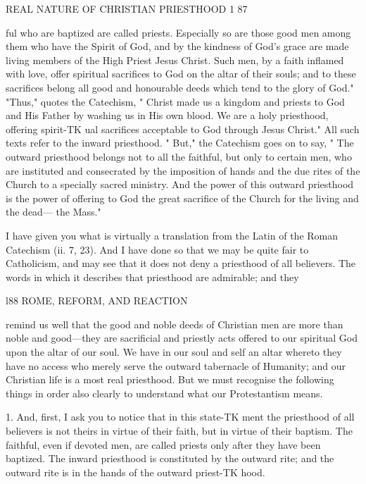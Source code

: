 \documentclass[12pt,a5paper,oneside]{book}
\begin{document}
{REAL NATURE OF CHRISTIAN PRIESTHOOD 1 87 

ful who are baptized are called priests. Especially so 
are those good men among them who have the Spirit 
of God, and by the kindness of God's grace are made 
living members of the High Priest Jesus Christ. Such 
men, by a faith inflamed with love, offer spiritual 
sacrifices to God on the altar of their souls; and to 
these sacrifices belong all good and honourable deeds 
which tend to the glory of God." "Thus," quotes 
the Catechism, " Christ made us a kingdom and 
priests to God and His Father by washing us in His 
own blood. We are a holy priesthood, offering spirit-TK
ual sacrifices acceptable to God through Jesus Christ." 
All such texts refer to the inward priesthood. " But," 
the Catechism goes on to say, " The outward priesthood 
belongs not to all the faithful, but only to certain men, 
who are instituted and consecrated by the imposition 
of hands and the due rites of the Church to a specially 
sacred ministry. And the power of this outward 
priesthood is the power of offering to God the great 
sacrifice of the Church for the living and the dead---
the Mass." 

I have given you what is virtually a translation from 
the Latin of the Roman Catechism (ii. 7, 23). And 
I have done so that we may be quite fair to 
Catholicism, and may see that it does not deny a 
priesthood of all believers. The words in which it 
describes that priesthood are admirable; and they 



l88 ROME, REFORM, AND REACTION 

remind us well that the good and noble deeds of 
Christian men are more than noble and good---they 
are sacrificial and priestly acts offered to our spiritual 
God upon the altar of our soul. We have in our 
soul and self an altar whereto they have no access who 
merely serve the outward tabernacle of Humanity; 
and our Christian life is a most real priesthood. But 
we must recognise the following things in order also 
clearly to understand what our Protestantism means. 

1. And, first, I ask you to notice that in this state-TK
ment the priesthood of all believers is not theirs in 
virtue of their faith, but in virtue of their baptism. 
The faithful, even if devoted men, are called priests 
only after they have been baptized. The inward 
priesthood is constituted by the outward rite; and 
the outward rite is in the hands of the outward priest-TK
hood. 

}
\end{document}
